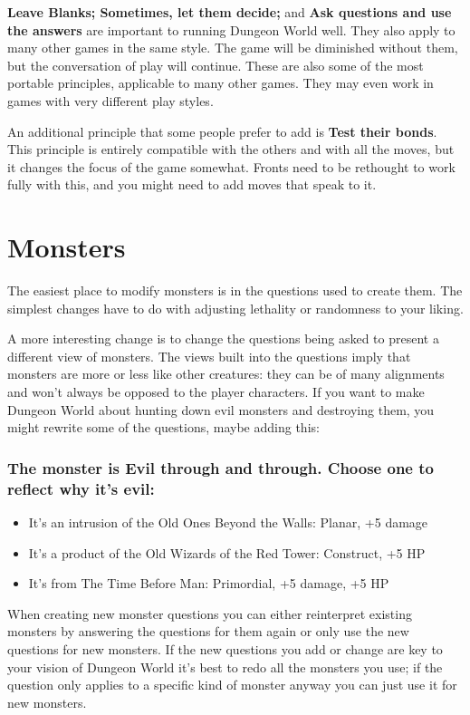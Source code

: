 \textbf{Leave Blanks; Sometimes, let them decide;}
and \textbf{Ask questions and use the answers}
are important to running Dungeon World well. They also apply to many other games in the same style. The game will be diminished without them, but the conversation of play will continue. These are also some of the most portable principles, applicable to many other games. They may even work in games with very different play styles.


An additional principle that some people prefer to add is \textbf{Test their bonds}. This principle is entirely compatible with the others and with all the moves, but it changes the focus of the game somewhat. Fronts need to be rethought to work fully with this, and you might need to add moves that speak to it.
\section*{Monsters}


The easiest place to modify monsters is in the questions used to create them. The simplest changes have to do with adjusting lethality or randomness to your liking.


A more interesting change is to change the questions being asked to present a different view of monsters. The views built into the questions imply that monsters are more or less like other creatures: they can be of many alignments and won't always be opposed to the player characters. If you want to make Dungeon World about hunting down evil monsters and destroying them, you might rewrite some of the questions, maybe adding this:
\subsubsection{The monster is Evil through and through. Choose one to reflect why it's evil:}
\begin{itemize}
\item It's an intrusion of the Old Ones Beyond the Walls: Planar, +5 damage
\item It's a product of the Old Wizards of the Red Tower: Construct, +5 HP
\item It's from The Time Before Man: Primordial, +5 damage, +5 HP

\end{itemize}


When creating new monster questions you can either reinterpret existing monsters by answering the questions for them again or only use the new questions for new monsters. If the new questions you add or change are key to your vision of Dungeon World it's best to redo all the monsters you use; if the question only applies to a specific kind of monster anyway you can just use it for new monsters.


